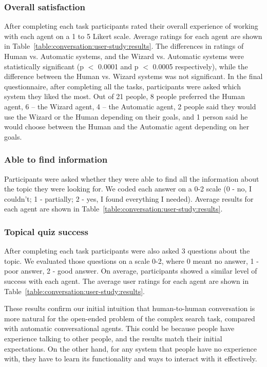 \subsubsection{Overall satisfaction}
After completing each task participants rated their overall experience of working with each agent on a 1 to 5 Likert scale.
Average ratings for each agent are shown in Table~\ref{table:conversation:user-study:results}.
The differences in ratings of Human vs. Automatic systems, and the Wizard vs. Automatic systems were statistically significant (p $<$ 0.0001 and p $<$ 0.0005 respectively), while the difference between the Human vs. Wizard systems was not significant.
In the final questionnaire, after completing all the tasks, participants were asked which system they liked the most.
Out of 21 people, 8 people preferred the Human agent, 6 -- the Wizard agent, 4 -- the Automatic agent, 2 people said they would use the Wizard or the Human depending on their goals, and 1 person said he would choose between the Human and the Automatic agent depending on her goals.

\subsubsection{Able to find information}
Participants were asked whether they were able to find all the information about the topic they were looking for.
We coded each answer on a 0-2 scale (0 - no, I couldn't; 1 - partially; 2 - yes, I found everything I needed).
Average results for each agent are shown in Table~\ref{table:conversation:user-study:results}.

\subsubsection{Topical quiz success}
After completing each task participants were also asked 3 questions about the topic. We evaluated those questions on a scale 0-2, where 0 meant no answer, 1 - poor answer, 2 - good answer.
On average, participants showed a similar level of success with each agent.
The average user ratings for each agent are shown in Table~\ref{table:conversation:user-study:results}.

These results confirm our initial intuition that human-to-human conversation is more natural for the open-ended problem of the complex search task, compared with automatic conversational agents. This could be because people have experience talking to other people, and the results match their initial expectations. On the other hand, for any system that people have no experience with, they have to learn its functionality and ways to interact with it effectively.

